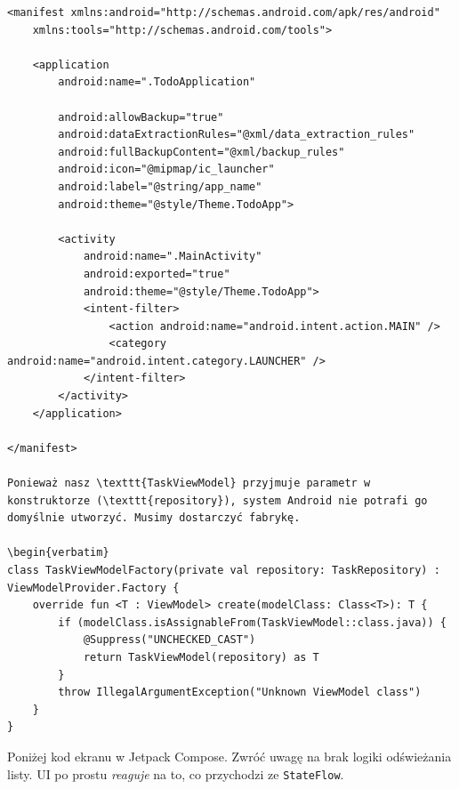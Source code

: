 \begin{verbatim}
<manifest xmlns:android="http://schemas.android.com/apk/res/android"
    xmlns:tools="http://schemas.android.com/tools">

    <application
        android:name=".TodoApplication"
        
        android:allowBackup="true"
        android:dataExtractionRules="@xml/data_extraction_rules"
        android:fullBackupContent="@xml/backup_rules"
        android:icon="@mipmap/ic_launcher"
        android:label="@string/app_name"
        android:theme="@style/Theme.TodoApp">
        
        <activity
            android:name=".MainActivity"
            android:exported="true"
            android:theme="@style/Theme.TodoApp">
            <intent-filter>
                <action android:name="android.intent.action.MAIN" />
                <category android:name="android.intent.category.LAUNCHER" />
            </intent-filter>
        </activity>
    </application>

</manifest>

Ponieważ nasz \texttt{TaskViewModel} przyjmuje parametr w konstruktorze (\texttt{repository}), system Android nie potrafi go domyślnie utworzyć. Musimy dostarczyć fabrykę.

\begin{verbatim}
class TaskViewModelFactory(private val repository: TaskRepository) : ViewModelProvider.Factory {
    override fun <T : ViewModel> create(modelClass: Class<T>): T {
        if (modelClass.isAssignableFrom(TaskViewModel::class.java)) {
            @Suppress("UNCHECKED_CAST")
            return TaskViewModel(repository) as T
        }
        throw IllegalArgumentException("Unknown ViewModel class")
    }
}
\end{verbatim}

Poniżej kod ekranu w Jetpack Compose. Zwróć uwagę na brak logiki odświeżania listy. UI po prostu \textit{reaguje} na to, co przychodzi ze \texttt{StateFlow}.

